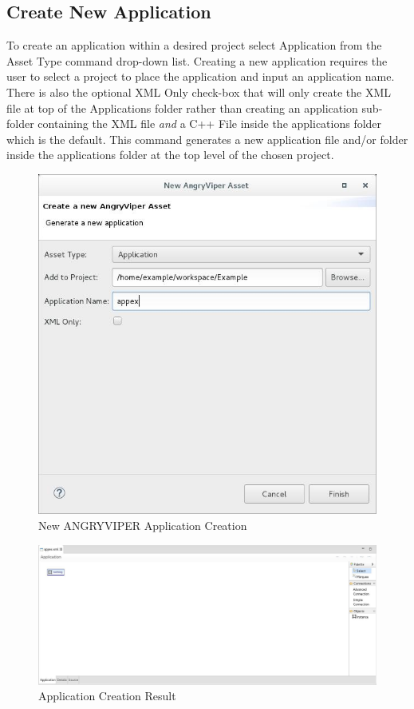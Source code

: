 \subsection{Create New Application}
\label{sec:create_application}
\begin{flushleft}

To create an application within a desired project select Application from the Asset Type command drop-down list. Creating a new application requires the user to select a project to place the application and input an application name. There is also the optional XML Only check-box that will only create the XML file at top of the Applications folder rather than creating an application sub-folder containing the XML file \textit{and} a C++ File inside the applications folder which is the default. This command generates a new application file and/or folder inside the applications folder at the top level of the chosen project.\newline
\begin{figure}[h!]
  \centering
  \includegraphics[scale=0.45]{figures/createapplication.jpg}
  \caption{New ANGRYVIPER Application Creation}
  \label{fig:figure12}
\end{figure}

\begin{figure}[h!]
  \centering
  \includegraphics[scale=0.31]{figures/applicationresult.jpg}
  \caption{Application Creation Result}
  \label{fig:figure13}
\end{figure}


\end{flushleft}

